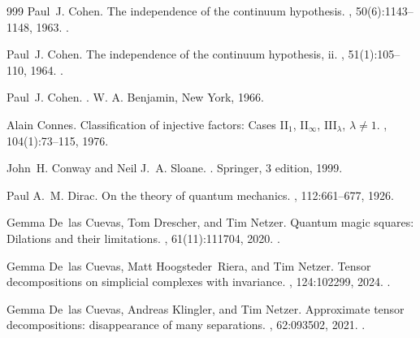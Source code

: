 \begin{thebibliography}{999}
Paul~J. Cohen.
\newblock The independence of the continuum hypothesis.
, 50(6):1143--1148, 1963.
\newblock \href {https://doi.org/10.1073/pnas.50.6.1143}
  {}.

Paul~J. Cohen.
\newblock The independence of the continuum hypothesis, ii.
, 51(1):105--110, 1964.
\newblock \href {https://doi.org/10.1073/pnas.51.1.105}
  {}.

Paul~J. Cohen.
.
\newblock W. A. Benjamin, New York, 1966.

Alain Connes.
\newblock Classification of injective factors: Cases {II}$_1$, {II}$_\infty$,
  {III}$_\lambda$, $\lambda\neq1$.
, 104(1):73--115, 1976.

John~H. Conway and Neil J.~A. Sloane.
.
\newblock Springer, 3 edition, 1999.

Paul A.~M. Dirac.
\newblock On the theory of quantum mechanics.
, 112:661--677, 1926.

Gemma De~las Cuevas, Tom Drescher, and Tim Netzer.
\newblock Quantum magic squares: Dilations and their limitations.
, 61(11):111704, 2020.
\newblock \href {https://doi.org/10.1063/5.0022344}
  {}.

Gemma De~las Cuevas, Matt Hoogsteder~Riera, and Tim Netzer.
\newblock Tensor decompositions on simplicial complexes with invariance.
, 124:102299, 2024.
\newblock \href {https://doi.org/10.1016/j.jsc.2024.102299}
  {}.

Gemma De~las Cuevas, Andreas Klingler, and Tim Netzer.
\newblock Approximate tensor decompositions: disappearance of many separations.
, 62:093502, 2021.
\newblock \href {https://doi.org/10.1063/5.0033876}
  {}.


\end{thebibliography}
